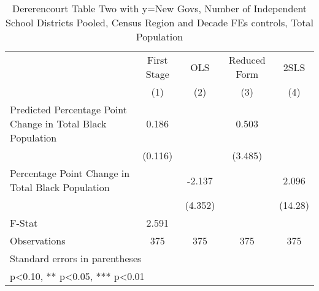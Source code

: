 \begin{table}[htbp]\centering
\def\sym#1{\ifmmode^{#1}\else\(^{#1}\)\fi}
\caption{Dererencourt Table Two with y=New Govs, Number of Independent School Districts  Pooled, Census Region and Decade FEs controls, Total Population}
\begin{tabular}{l*{4}{c}}
\toprule
                    & First Stage   &         OLS   &Reduced Form   &        2SLS   \\
                    &\multicolumn{1}{c}{(1)}   &\multicolumn{1}{c}{(2)}   &\multicolumn{1}{c}{(3)}   &\multicolumn{1}{c}{(4)}   \\
\midrule
Predicted Percentage Point Change in Total Black Population&       0.186   &               &       0.503   &               \\
                    &     (0.116)   &               &     (3.485)   &               \\
\addlinespace
Percentage Point Change in Total Black Population&               &      -2.137   &               &       2.096   \\
                    &               &     (4.352)   &               &     (14.28)   \\
\midrule
F-Stat              &       2.591   &               &               &               \\
Observations        &         375   &         375   &         375   &         375   \\
\bottomrule
\multicolumn{5}{l}{\footnotesize Standard errors in parentheses}\\
\multicolumn{5}{l}{\footnotesize * p<0.10, ** p<0.05, *** p<0.01}\\
\end{tabular}
\end{table}
